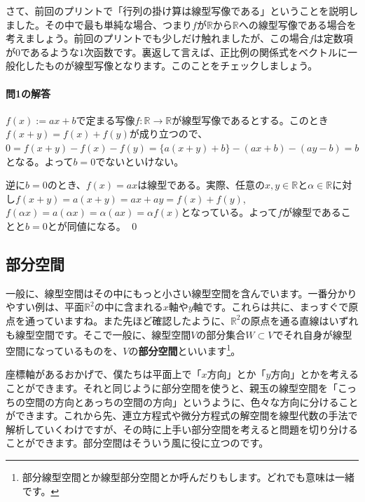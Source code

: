 さて、前回のプリントで「行列の掛け算は線型写像である」ということを説明しました。その中で最も単純な場合、つまり$f$が$\mathbb{R}$から$\mathbb{R}$への線型写像である場合を考えましょう。前回のプリントでも少しだけ触れましたが、この場合$f$は定数項が$0$であるような$1$次函数です。裏返して言えば、正比例の関係式をベクトルに一般化したものが線型写像となります。このことをチェックしましょう。

\paragraph{問1の解答}
$f(x) := ax + b$で定まる写像$f\colon\mathbb{R}\rightarrow\mathbb{R}$が線型写像であるとする。このとき$f(x + y) = f(x) + f(y)$が成り立つので、$0 = f(x + y) - f(x) - f(y) = \{a(x + y) + b\} - (ax + b) - (ay - b) = b$となる。よって$b = 0$でないといけない。

逆に$b = 0$のとき、$f(x) = ax$は線型である。実際、任意の$x, y\in\mathbb{R}$と$\alpha\in\mathbb{R}$に対し$f(x + y) = a(x + y) = ax + ay = f(x) + f(y)$, $f(\alpha x) = a (\alpha x) = \alpha (ax) = \alpha f(x)$となっている。よって$f$が線型であることと$b = 0$とが同値になる。 \qed

\subsection{部分空間}

一般に、線型空間はその中にもっと小さい線型空間を含んでいます。一番分かりやすい例は、平面$\mathbb{R}^2$の中に含まれる$x$軸や$y$軸です。これらは共に、まっすぐで原点を通っていますね。また先ほど確認したように、$\mathbb{R}^2$の原点を通る直線はいずれも線型空間です。そこで一般に、線型空間$V$の部分集合$W\subset V$でそれ自身が線型空間になっているものを、$V$の\textbf{部分空間}といいます\footnote{部分線型空間とか線型部分空間とか呼んだりもします。どれでも意味は一緒です。}。

座標軸があるおかげで、僕たちは平面上で「$x$方向」とか「$y$方向」とかを考えることができます。それと同じように部分空間を使うと、親玉の線型空間を「こっちの空間の方向とあっちの空間の方向」というように、色々な方向に分けることができます。これから先、連立方程式や微分方程式の解空間を線型代数の手法で解析していくわけですが、その時に上手い部分空間を考えると問題を切り分けることができます。部分空間はそういう風に役に立つのです。

